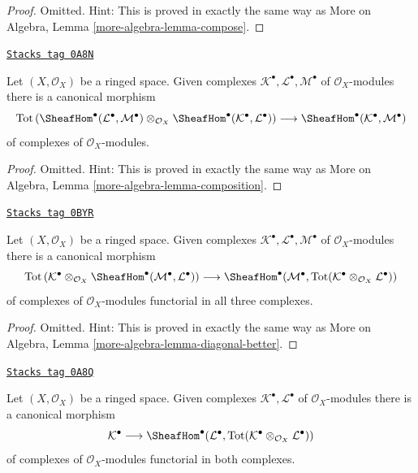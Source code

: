 \begin{proof}
Omitted. Hint: This is proved in exactly the same way as
More on Algebra, Lemma \ref{more-algebra-lemma-compose}.
\end{proof}

\begin{lemma}[Composition]
\label{cohomology-lemma-composition}
\href{https://stacks.math.columbia.edu/tag/0A8N}{\texttt{Stacks tag 0A8N}}

Let $(X, \mathcal{O}_X)$ be a ringed space. Given complexes
$\mathcal{K}^\bullet, \mathcal{L}^\bullet, \mathcal{M}^\bullet$
of $\mathcal{O}_X$-modules there is a canonical morphism
$$
\text{Tot}\left(
\SheafHom^\bullet(\mathcal{L}^\bullet, \mathcal{M}^\bullet)
\otimes_{\mathcal{O}_X}
\SheafHom^\bullet(\mathcal{K}^\bullet, \mathcal{L}^\bullet)
\right)
\longrightarrow
\SheafHom^\bullet(\mathcal{K}^\bullet, \mathcal{M}^\bullet)
$$
of complexes of $\mathcal{O}_X$-modules.
\end{lemma}

\begin{proof}
Omitted. Hint: This is proved in exactly the same way as
More on Algebra, Lemma \ref{more-algebra-lemma-composition}.
\end{proof}

\begin{lemma}
\label{cohomology-lemma-diagonal-better}
\href{https://stacks.math.columbia.edu/tag/0BYR}{\texttt{Stacks tag 0BYR}}

Let $(X, \mathcal{O}_X)$ be a ringed space. Given complexes
$\mathcal{K}^\bullet, \mathcal{L}^\bullet, \mathcal{M}^\bullet$
of $\mathcal{O}_X$-modules there is a canonical morphism
$$
\text{Tot}\left(
\mathcal{K}^\bullet \otimes_{\mathcal{O}_X}
\SheafHom^\bullet(\mathcal{M}^\bullet, \mathcal{L}^\bullet)
\right)
\longrightarrow
\SheafHom^\bullet(\mathcal{M}^\bullet,
\text{Tot}(\mathcal{K}^\bullet \otimes_{\mathcal{O}_X} \mathcal{L}^\bullet))
$$
of complexes of $\mathcal{O}_X$-modules functorial in all three complexes.
\end{lemma}

\begin{proof}
Omitted. Hint: This is proved in exactly the same way as
More on Algebra, Lemma \ref{more-algebra-lemma-diagonal-better}.
\end{proof}

\begin{lemma}[Diagonal]
\label{cohomology-lemma-diagonal}
\href{https://stacks.math.columbia.edu/tag/0A8Q}{\texttt{Stacks tag 0A8Q}}

Let $(X, \mathcal{O}_X)$ be a ringed space. Given complexes
$\mathcal{K}^\bullet, \mathcal{L}^\bullet$
of $\mathcal{O}_X$-modules there is a canonical morphism
$$
\mathcal{K}^\bullet
\longrightarrow
\SheafHom^\bullet(\mathcal{L}^\bullet,
\text{Tot}(\mathcal{K}^\bullet \otimes_{\mathcal{O}_X} \mathcal{L}^\bullet))
$$
of complexes of $\mathcal{O}_X$-modules functorial in both complexes.
\end{lemma}

